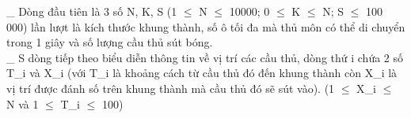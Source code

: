 \_ Dòng đầu tiên là 3 số N, K, S (1 $\le$  N  $\le$ 10000; 0 $\le$  K  $\le$ N; S $\le$ 100 000) lần lượt là kích thước khung thành, số ô tối đa mà thủ môn có thể di chuyển trong 1 giây và số lượng cầu thủ sút bóng.   
\\   \_ S dòng tiếp theo biểu diễn thông tin về vị trí các cầu thủ, dòng thứ i chứa 2 số T\_i và X\_i (với T\_i là khoảng cách từ cầu thủ đó đến khung thành còn X\_i là vị trí được đánh số trên khung thành mà cầu thủ đó sẽ sút vào). (1 $\le$  X\_i  $\le$ N và 1 $\le$  T\_i  $\le$ 100)  

\